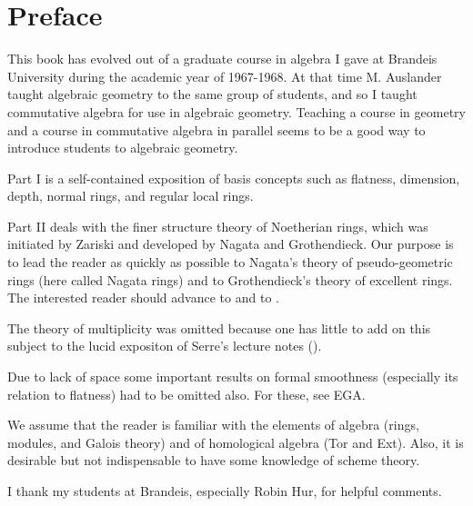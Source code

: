 \documentclass[../main]{subfiles}
\begin{document}
\chapter*{Preface}

This book has evolved out of a graduate course in algebra I gave at Brandeis University during the academic year of 1967-1968. At that time M. Auslander taught algebraic geometry to the same group of students, and so I taught commutative algebra for use in algebraic geometry. Teaching a course in geometry and a course in commutative algebra in parallel seems to be a good way to introduce students to algebraic geometry.

Part I is a self-contained exposition of basis concepts such as flatness, dimension, depth, normal rings, and regular local rings.

Part II deals with the finer structure theory of Noetherian rings, which was initiated by Zariski \cite{zariski1950sur} and developed by Nagata and Grothendieck. Our purpose is to lead the reader as quickly as possible to Nagata’s theory of pseudo-geometric rings (here called Nagata rings) and to Grothendieck’s theory of excellent rings. The interested reader should advance to \cite{nagata1975local} and to \cite{egaIV}.

The theory of multiplicity was omitted because one has little to add on this subject to the lucid expositon of Serre’s lecture notes (\cite{serre2000local}).

Due to lack of space some important results on formal smoothness (especially its relation to flatness) had to be omitted also. For these, see EGA.

We assume that the reader is familiar with the elements of algebra (rings, modules, and Galois theory) and of homological algebra (Tor and Ext). Also, it is desirable but not indispensable to have some knowledge of scheme theory.

I thank my students at Brandeis, especially Robin Hur, for helpful comments. 
\end{document}
